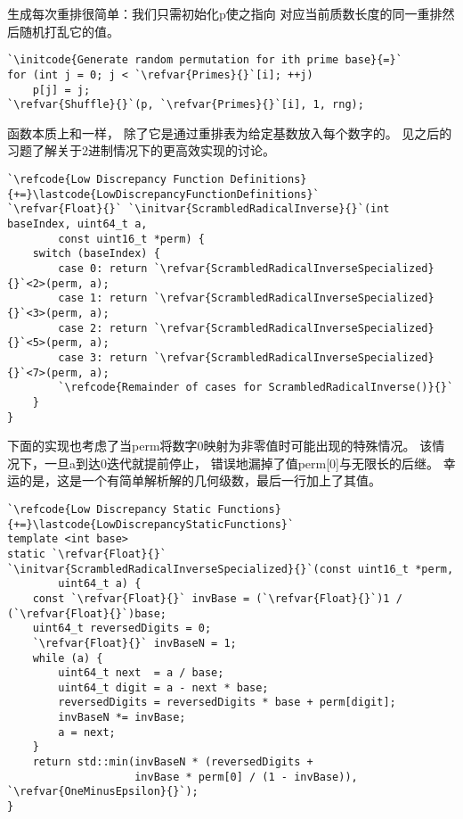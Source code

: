 生成每次重排很简单：我们只需初始化{\ttfamily p}使之指向
对应当前质数长度的同一重排然后随机打乱它的值。
\begin{lstlisting}
`\initcode{Generate random permutation for ith prime base}{=}`
for (int j = 0; j < `\refvar{Primes}{}`[i]; ++j)
    p[j] = j;
`\refvar{Shuffle}{}`(p, `\refvar{Primes}{}`[i], 1, rng);
\end{lstlisting}

函数本质上和一样，
除了它是通过重排表为给定基数放入每个数字的。
见之后的习题了解关于2进制情况下的更高效实现的讨论。
\begin{lstlisting}
`\refcode{Low Discrepancy Function Definitions}{+=}\lastcode{LowDiscrepancyFunctionDefinitions}`
`\refvar{Float}{}` `\initvar{ScrambledRadicalInverse}{}`(int baseIndex, uint64_t a,
        const uint16_t *perm) {
    switch (baseIndex) {
        case 0: return `\refvar{ScrambledRadicalInverseSpecialized}{}`<2>(perm, a);
        case 1: return `\refvar{ScrambledRadicalInverseSpecialized}{}`<3>(perm, a);
        case 2: return `\refvar{ScrambledRadicalInverseSpecialized}{}`<5>(perm, a);
        case 3: return `\refvar{ScrambledRadicalInverseSpecialized}{}`<7>(perm, a);
        `\refcode{Remainder of cases for ScrambledRadicalInverse()}{}`
    }
}
\end{lstlisting}

下面的实现也考虑了当{\ttfamily perm}将数字0映射为非零值时可能出现的特殊情况。
该情况下，一旦{\ttfamily a}到达0迭代就提前停止，
错误地漏掉了值{\ttfamily perm[0]}与无限长的后继。
幸运的是，这是一个有简单解析解的几何级数，最后一行加上了其值。
\begin{lstlisting}
`\refcode{Low Discrepancy Static Functions}{+=}\lastcode{LowDiscrepancyStaticFunctions}`
template <int base>
static `\refvar{Float}{}` `\initvar{ScrambledRadicalInverseSpecialized}{}`(const uint16_t *perm,
        uint64_t a) {
    const `\refvar{Float}{}` invBase = (`\refvar{Float}{}`)1 / (`\refvar{Float}{}`)base;
    uint64_t reversedDigits = 0;
    `\refvar{Float}{}` invBaseN = 1;
    while (a) {
        uint64_t next  = a / base;
        uint64_t digit = a - next * base;
        reversedDigits = reversedDigits * base + perm[digit];
        invBaseN *= invBase;
        a = next;
    }
    return std::min(invBaseN * (reversedDigits +
                    invBase * perm[0] / (1 - invBase)), `\refvar{OneMinusEpsilon}{}`);
}
\end{lstlisting}

